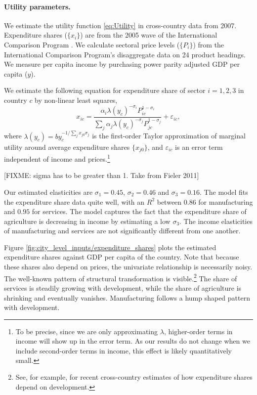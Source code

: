 \documentclass[12pt]{article}
\begin{document}
\paragraph{Utility parameters.}
We estimate the utility function \eqref{eq:Utility} in cross-country data from 2007. Expenditure shares ($\{x_i\}$) are from the 2005 wave of the International Comparison Program \cite{icp}. We calculate sectoral price levels ($\{P_i\}$) from the International Comparison Program's disaggregate data on 24 product headings. We measure per capita income by purchasing power parity adjusted GDP per capita ($y$).

We estimate the following equation for expenditure share of sector $i=1,2,3$ in country $c$ by non-linear least squares,
\begin{equation}\label{eq:estimable:utility}
	x_{ic} =
	\frac 	{\alpha_i \lambda(y_c)^{-\sigma_i}  P_{ic}^{1-\sigma_i}}
			{\sum_j {\alpha_j \lambda(y_c)^{-\sigma_j}  P_{jc}^{1-\sigma_j}}}
	+ \varepsilon_{ic},
\end{equation}
where $\lambda(y_c) = by_c^{-1/\sum_j x_{j0}\sigma_j}$ is the first-order Taylor approximation of marginal utility around average expenditure shares $\{x_{j0}\}$, and $\varepsilon_{ic}$ is an error term independent of income and prices.\footnote{To be precise, since we are only approximating $\lambda$, higher-order terms in income will show up in the error term. As our results do not change when we include second-order terms in income, this effect is likely quantitatively small.}

[FIXME: sigma has to be greater than 1. Take from Fieler 2011]

Our estimated elasticities are $\sigma_1=0.45$, $\sigma_2=0.46$ and $\sigma_3=0.16$. The model fits the expenditure share data quite well, with an $R^2$ between $0.86$ for manufacturing and $0.95$ for services. The model captures the fact that the expenditure share of agriculture is decreasing in income by estimating a low $\sigma_3$. The income elasticities of manufacturing and services are not significantly different from one another. 

Figure \ref{fig:city_level_inputs/expenditure_shares} plots the estimated expenditure shares against GDP per capita of the country. Note that because these shares also depend on prices, the univariate relationship is necessarily noisy. The well-known pattern of structural transformation is visible.\footnote{See, for example,  for recent cross-country estimates of how expenditure shares depend on development.} The share of services is steadily growing with development, while the share of agriculture is shrinking and eventually vanishes. Manufacturing follows a hump shaped pattern with development.
\end{document}
